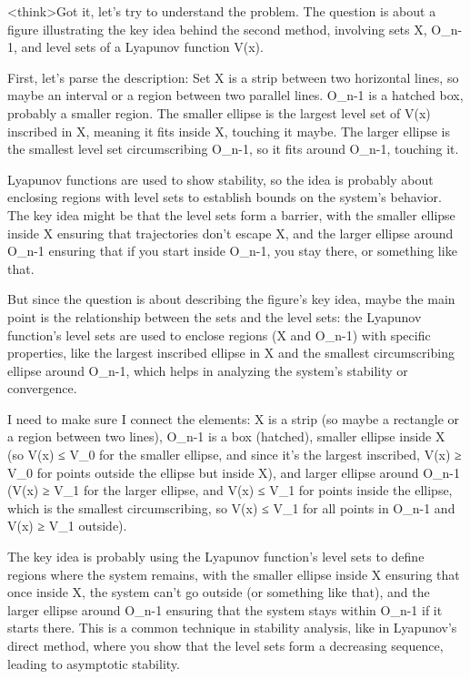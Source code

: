 <think>Got it, let's try to understand the problem. The question is about a figure illustrating the key idea behind the second method, involving sets X, O_{n-1}, and level sets of a Lyapunov function V(x). 

First, let's parse the description: Set X is a strip between two horizontal lines, so maybe an interval or a region between two parallel lines. O_{n-1} is a hatched box, probably a smaller region. The smaller ellipse is the largest level set of V(x) inscribed in X, meaning it fits inside X, touching it maybe. The larger ellipse is the smallest level set circumscribing O_{n-1}, so it fits around O_{n-1}, touching it. 

Lyapunov functions are used to show stability, so the idea is probably about enclosing regions with level sets to establish bounds on the system's behavior. The key idea might be that the level sets form a barrier, with the smaller ellipse inside X ensuring that trajectories don't escape X, and the larger ellipse around O_{n-1} ensuring that if you start inside O_{n-1}, you stay there, or something like that. 

But since the question is about describing the figure's key idea, maybe the main point is the relationship between the sets and the level sets: the Lyapunov function's level sets are used to enclose regions (X and O_{n-1}) with specific properties, like the largest inscribed ellipse in X and the smallest circumscribing ellipse around O_{n-1}, which helps in analyzing the system's stability or convergence. 

I need to make sure I connect the elements: X is a strip (so maybe a rectangle or a region between two lines), O_{n-1} is a box (hatched), smaller ellipse inside X (so V(x) ≤ V_0 for the smaller ellipse, and since it's the largest inscribed, V(x) ≥ V_0 for points outside the ellipse but inside X), and larger ellipse around O_{n-1} (V(x) ≥ V_1 for the larger ellipse, and V(x) ≤ V_1 for points inside the ellipse, which is the smallest circumscribing, so V(x) ≤ V_1 for all points in O_{n-1} and V(x) ≥ V_1 outside). 

The key idea is probably using the Lyapunov function's level sets to define regions where the system remains, with the smaller ellipse inside X ensuring that once inside X, the system can't go outside (or something like that), and the larger ellipse around O_{n-1} ensuring that the system stays within O_{n-1} if it starts there. This is a common technique in stability analysis, like in Lyapunov's direct method, where you show that the level sets form a decreasing sequence, leading to asymptotic stability. 

